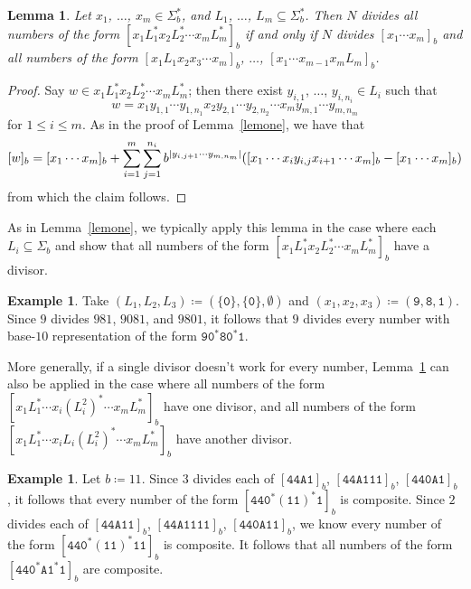 \documentclass[12pt]{article}
\DeclarePairedDelimiter\abs{\lvert}{\rvert}
\theoremstyle{plain}
\newtheorem{lemma}[theorem]{Lemma}
\theoremstyle{definition}
\newtheorem{example}[theorem]{Example}
\newcommand{\0}{\mathtt{0}}
\newcommand{\1}{\mathtt{1}}
\newcommand{\2}{\mathtt{2}}
\newcommand{\3}{\mathtt{3}}
\newcommand{\4}{\mathtt{4}}
\newcommand{\5}{\mathtt{5}}
\newcommand{\6}{\mathtt{6}}
\newcommand{\7}{\mathtt{7}}
\newcommand{\8}{\mathtt{8}}
\newcommand{\9}{\mathtt{9}}
\newcommand{\A}{\mathtt{A}}
\begin{document}
\begin{lemma}\label{lemtwo}
Let\/ $x_1$, $\dotsc$, $x_m\in \Sigma^*_b$, and\/ $L_1$, $\dotsc$, 
$L_m\subseteq\Sigma^*_b$.  Then\/
$N$ divides all numbers of the form\/ $[x_1L_1^*x_2L_2^*\dotsm x_mL_m^*]_b$
if and only if\/
$N$ divides\/ $[x_1\dotsm x_m]_b$ and all numbers of the form\/ 
$[x_1L_1x_2x_3\dotsm x_m]_b$, $\dotsc$, $[x_1\dotsm x_{m-1}x_mL_m]_b$.
\end{lemma}
\begin{proof}
Say $w\in x_1L_1^*x_2L_2^*\dotsm x_mL_m^*$; then there exist
$y_{i,1}$, $\dotsc$, $y_{i,n_i}\in L_i$ such that
\[ w = x_1y_{1,1}\dotsm y_{1,n_1}x_2y_{2,1}\dotsm y_{2,n_2}\dotsm x_m y_{m,1}\dotsm y_{m,n_m} \]
for $1\leq i\leq m$.
As in the proof of Lemma~\ref{lemone}, we have that
\[ [w]_b = [x_1\dotsm x_m]_b + \sum_{i=1}^m\sum_{j=1}^{n_i} b^{\abs{y_{i,j+1}\dotsm y_{m,n_m}}}([x_1\dotsm x_i y_{i,j} x_{i+1}\dotsm x_m]_b-[x_1\dotsm x_m]_b) \]
from which the claim follows.
\end{proof}
As in Lemma~\ref{lemone}, we typically apply this lemma in the case 
where each $L_i\subseteq\Sigma_b$ and show that all numbers of the 
form $[x_1L_1^*x_2L_2^*\dotsm x_mL_m^*]_b$ have a divisor.
\begin{example}
Take $(L_1, L_2, L_3) \coloneqq (\{ \0 \},\{\0\},\emptyset)$ and $(x_1,x_2, x_3) \coloneqq (\9, \8, \1)$.
Since $9$ divides $981$, $9081$, and $9801$, it follows that $9$ 
divides every number with base-$10$ representation
of the form $\9\0^*\8\0^*\1$.
\end{example}

More generally, if a single divisor doesn't work for every number, 
Lemma~\ref{lemtwo} can also be applied in the case where all numbers 
of the form $[x_1L_1^*\dotsm x_i(L_i^2)^*\dotsm x_mL_m^*]_b$ have one
divisor, and all numbers of the form 
$[x_1L_1^*\dotsm x_iL_i(L_i^2)^*\dotsm x_mL_m^*]_b$ have another divisor.
\begin{example}
Let $b \coloneqq 11$.
Since $3$ divides each of $[\4\4\A\1]_b$,
$[\4\4\A\1\1\1]_b$,
$[\4\4\0\A\1]_b$ ,
it follows that
every number of the form $[\4\4\0^*(\1\1)^*\1]_b$ is composite.
Since $2$ divides each of $[\4\4\A\1\1]_b$,
$[\4\4\A\1\1\1\1]_b$, $[\4\4\0\A\1\1]_b$, we know
every number of the form $[\4\4\0^*(\1\1)^*\1\1]_b$ is composite.
It follows that all numbers of the form $[\4\4\0^*\A\1^*\1]_b$ are composite.
\end{example}
\end{document}
